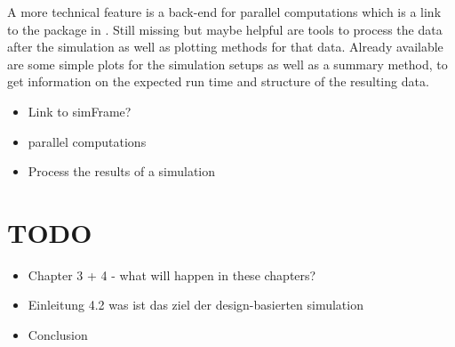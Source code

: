\documentclass[article]{ajs}
\begin{document}
A more technical feature is a back-end for parallel computations which is a link to the  package in . Still missing but maybe helpful are tools to process the data after the simulation as well as plotting methods for that data. Already available are some simple plots for the simulation setups as well as a summary method, to get information on the expected run time and structure of the resulting data.


\begin{itemize}
	\item Link to simFrame?
	\item parallel computations
	\item Process the results of a simulation
\end{itemize}

\section{TODO}
\begin{itemize}
	\item Chapter 3 + 4 - what will happen in these chapters?
	\item Einleitung 4.2 was ist das ziel der design-basierten simulation
	\item Conclusion
\end{itemize}

%

\end{document}
